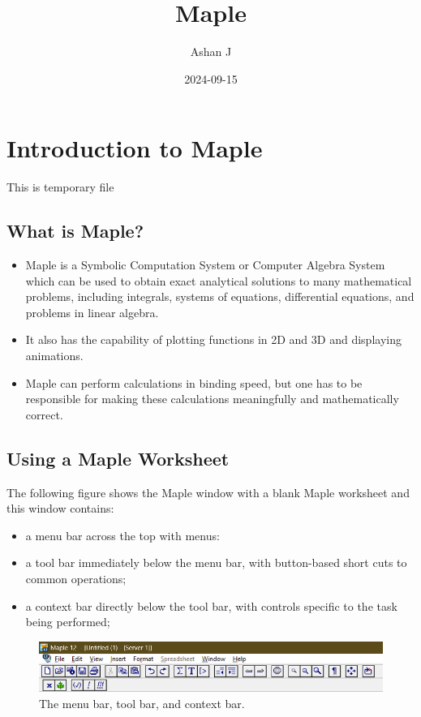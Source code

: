 \documentclass[
]{book}
\title{Maple}
\author{Ashan J}
\date{2024-09-15}
\providecommand{\tightlist}{%
  \setlength{\itemsep}{0pt}\setlength{\parskip}{0pt}}
\theoremstyle{definition}
\theoremstyle{definition}
\theoremstyle{definition}
\theoremstyle{definition}
\theoremstyle{remark}
\begin{document}
\maketitle

{
\setcounter{tocdepth}{1}
\tableofcontents
}
\chapter{Introduction to Maple}\label{introduction-to-maple}

This is temporary file

\section{What is Maple?}\label{what-is-maple}

\begin{itemize}
\tightlist
\item
  Maple is a Symbolic Computation System or Computer Algebra System which can be used to obtain exact analytical solutions to many mathematical problems, including integrals, systems of equations, differential equations, and problems in linear algebra.
\item
  It also has the capability of plotting functions in 2D and 3D and displaying animations.
\item
  Maple can perform calculations in binding speed, but one has to be responsible for making these calculations meaningfully and mathematically correct.
\end{itemize}

\section{Using a Maple Worksheet}\label{using-a-maple-worksheet}

The following figure shows the Maple window with a blank Maple worksheet and this window contains:

\begin{itemize}
\tightlist
\item
  a menu bar across the top with menus:
\item
  a tool bar immediately below the menu bar, with button-based short cuts to common operations;
\item
  a context bar directly below the tool bar, with controls specific to the task being performed;
\end{itemize}

\begin{figure}
\centering
\includegraphics{figures/Lesson 1/fig1.png}
\caption{The menu bar, tool bar, and context bar.}
\end{figure}
\end{document}

